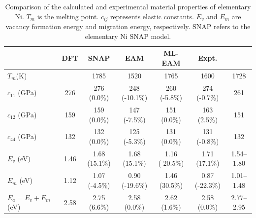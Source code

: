 \documentclass[prb,reprint]{revtex4-2}
\begin{document}
% 
%
\begin{table}[h]
\centering
\begin{tabular}{lcccccc}
\hline
    & DFT & SNAP & EAM & ML-EAM & Expt. \\
\hline
$T_{m}$(K) & & 1785 & 1520 & 1765 & 1600 & 1728 \\
$c_{11}$ (GPa) & 276 & 276 (0.0\%) & 248 (-10.1\%) & 260 (-5.8\%) & 274 (-0.7\%) & 261 \\
$c_{12}$ (GPa) & 159 & 159 (0.0\%) & 147 (-7.5\%) & 151 (0.0\%) & 163 (2.5\%) & 151 \\
$c_{44}$ (GPa) & 132 & 132 (0.0\%) & 125 (-5.3\%) & 131 (0.0\%) & 131 (-0.8\%) & 132 \\
$E_{v}$ (eV) & 1.46 & 1.68 (15.1\%) & 1.68 (15.1\%) & 1.16 (-20.5\%) & 1.71 (17.1\%) & 1.54–1.80 \\
$E_{m}$ (eV) & 1.12 & 1.07 (-4.5\%) & 0.90 (-19.6\%) & 1.46 (30.5\%) & 0.87 (-22.3\%) & 1.01–1.48 \\
$E_{a} = E_{v} + E_{m} $ (eV) & 2.58 & 2.75 (6.6\%) & 2.58 (0.0\%) & 2.62 (1.6\%) & 2.58 (0.0\%) & 2.77–2.95 \\
\hline
\end{tabular}
\caption{\label{table:elementary_Ni} Comparison of the calculated and 
experimental material properties of elementary Ni. $T_{m}$ is the melting 
point. $c_{ij}$ represents elastic constants. $E_{v}$ and $E_{m}$ are vacancy 
formation energy and migration energy, respectively. SNAP refers to the 
elementary Ni SNAP model.
}
\end{table}


\end{document}
